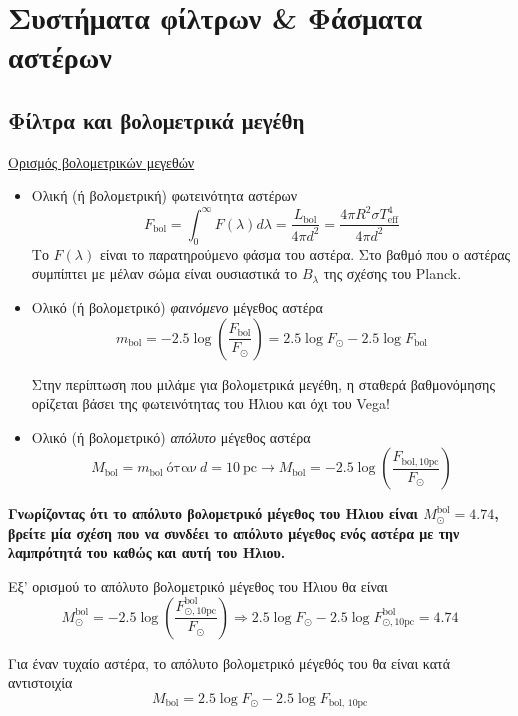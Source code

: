 \chapter{Συστήματα φίλτρων \& Φάσματα αστέρων}
\label{ch:Chapter3}

\section{Φίλτρα και βολομετρικά μεγέθη}

\underline{Ορισμός βολομετρικών μεγεθών}

\begin{itemize}
    \item Ολική (ή βολομετρική) φωτεινότητα αστέρων 
    $$F_{\text{bol}} = \int_0^{\infty}F(\lambda) d\lambda = \frac{L_{\text{bol}}}{4 \pi d^2} = \frac{4\pi R^2 \sigma T_{\text{eff}}^4}{4\pi d^2}$$
    Το $F(\lambda)$ είναι το παρατηρούμενο φάσμα του αστέρα. Στο βαθμό που ο αστέρας συμπίπτει με μέλαν σώμα είναι ουσιαστικά το $B_{\lambda}$ της σχέσης του Planck.
    \item Ολικό (ή βολομετρικό) \textit{φαινόμενο} μέγεθος αστέρα 
    $$m_{\text{bol}} = -2.5 \log \left( \frac{F_{\text{bol}}}{F_{\odot}} \right) = 2.5 \log F_{\odot} - 2.5 \log F_{\text{bol}}$$
    
    {\color{red} Στην περίπτωση που μιλάμε για βολομετρικά μεγέθη, η σταθερά βαθμονόμησης ορίζεται βάσει της φωτεινότητας του Ήλιου και όχι του Vega!}
    \item Ολικό (ή βολομετρικό) \textit{απόλυτο} μέγεθος αστέρα
    $$M_{\text{bol}} = m_{\text{bol}} \ \text{όταν} \ d = 10 \ \text{pc} \longrightarrow M_{\text{bol}} = -2.5 \log \left( \frac{F_{\text{bol}, 10 \text{pc}}}{F_{\odot}} \right)$$
\end{itemize}

\textbf{Γνωρίζοντας ότι το απόλυτο βολομετρικό μέγεθος του Ήλιου είναι $M_{\odot}^{\text{bol}} = 4.74$, βρείτε μία σχέση που να συνδέει το απόλυτο μέγεθος ενός αστέρα με την λαμπρότητά του καθώς και αυτή του Ήλιου.}

Εξ' ορισμού το απόλυτο βολομετρικό μέγεθος του Ήλιου θα είναι
$$M_{\odot}^{\text{bol}} = -2.5 \log \left( \frac{F_{\odot, \text{10pc}}^{\text{bol}}}{F_{\odot}} \right) \Rightarrow 2.5 \log F_{\odot} - 2.5 \log F_{\odot, \text{10pc}}^{\text{bol}} = 4.74 $$

Για έναν τυχαίο αστέρα, το απόλυτο βολομετρικό μέγεθός του θα είναι κατά αντιστοιχία
$$M_{\text{bol}} = 2.5 \log F_{\odot} - 2.5 \log F_{\text{bol, 10pc}}$$

